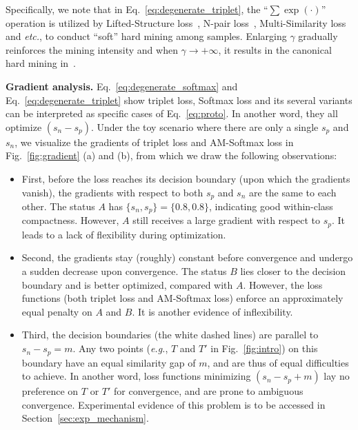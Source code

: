 \documentclass[10pt,twocolumn,letterpaper]{article}
\begin{document}
Specifically, we note that in Eq.~\ref{eq:degenerate_triplet}, the ``$\sum\exp(\cdot)$'' operation is utilized by Lifted-Structure loss~\cite{oh2016deep}, N-pair loss~\cite{Sohn2016ImprovedDM}, Multi-Similarity loss~\cite{wang2019multi} and \emph{etc.}, to conduct ``soft'' hard mining among samples. Enlarging $\gamma$ gradually reinforces the mining intensity and when $\gamma\rightarrow+\infty$, it results in the canonical hard mining in~\cite{schroff2015facenet, hermans2017defense}.

\textbf{Gradient analysis.} 
Eq.~\ref{eq:degenerate_softmax} and Eq.~\ref{eq:degenerate_triplet} show triplet loss, Softmax loss and its several variants can be interpreted as specific cases of Eq.~\ref{eq:proto}. In another word, they all optimize $(s_n-s_p)$. %
Under the toy scenario where there are only a single $s_p$ and $s_n$, we visualize the gradients of triplet loss and AM-Softmax loss in Fig.~\ref{fig:gradient} (a) and (b), from which we draw the following observations:
\begin{itemize}
\item First, before the loss reaches its decision boundary (upon which the gradients vanish), the gradients with respect to both $s_p$ and $s_n$ are the same to each other. The status $A$ has $\{s_n, s_p\}=\{0.8,0.8\}$, indicating good within-class compactness. However, $A$ still receives a large gradient with respect to $s_p$.
It leads to a lack of flexibility during optimization. %

\item Second, the gradients stay (roughly) constant before convergence and undergo a sudden decrease upon convergence. The status $B$ lies closer to the decision boundary and is better optimized, compared with $A$. However, the loss functions (both triplet loss and AM-Softmax loss) enforce an approximately equal penalty on $A$ and $B$. It is another evidence of inflexibility. 

\item Third, the decision boundaries (the white dashed lines) are parallel to $s_n-s_p=m$. Any two points (\emph{e.g.}, $T$ and $T'$ in Fig.~\ref{fig:intro}) on this boundary have an equal similarity gap of $m$, and are thus of equal difficulties to achieve. In another word, loss functions minimizing $(s_n-s_p+m)$ lay no preference on $T$ or $T'$ for convergence, and are prone to ambiguous convergence. Experimental evidence of this problem is to be accessed in Section~\ref{sec:exp_mechanism}.
\end{itemize}
\end{document}
